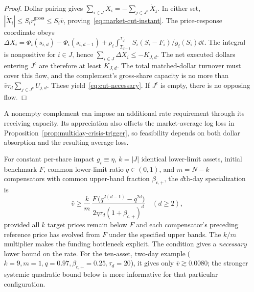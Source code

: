 \documentclass[review,hidelinks,onefignum,onetabnum]{siamonline250211}
\begin{document}
\begin{proof}
Dollar pairing gives $\sum_{i\in J}\dot X_i=-\sum_{j\in J^c}\dot X_j$. In either set, $|\dot X_i|\le S_i r_i^{\mathrm{gross}}\le S_i\bar v$, proving~\eqref{eq:market-cut-instant}. The price-response coordinate obeys
$\Delta X_i=\Phi_i(s_{i,d})-\Phi_i(s_{i,d-1})+
\rho_i\int_{T_{d-1}}^{T_d}S_i(S_i-F_i)/g_i(S_i)\dd t$.
The integral is nonpositive for $i\in J$, hence $\sum_{i\in J}\Delta X_i\le-K_{J,d}$. The net executed dollars entering $J^c$ are therefore at least $K_{J,d}$. The total matched-dollar turnover must cover this flow, and the complement's gross-share capacity is no more than $\bar v\tau_d\sum_{j\in J^c}U_{j,d}$. These yield~\eqref{eq:cut-necessary}. If $J^c$ is empty, there is no opposing flow.
\end{proof}
A nonempty complement can impose an additional rate requirement through its receiving capacity. Its appreciation also offsets the market-average log loss in Proposition~\ref{prop:multiday-crisis-trigger}, so feasibility depends on both dollar absorption and the resulting average loss.

For constant per-share impact $g_i\equiv\eta$, $k=|J|$ identical lower-limit assets, initial benchmark $F$, common lower-limit ratio $q\in(0,1)$, and $m=N-k$ compensators with common upper-band fraction $\beta_{c,+}$, the $d$th-day specialization is
\begin{equation}\label{eq:cut-special}
\boxed{\bar v\ge \frac{k}{m}\,
\frac{F\,\big(q^{2(d-1)}-q^{2d}\big)}{2\eta\tau_d(1+\beta_{c,+})^{d}}\quad(d\ge2),}
\end{equation}
provided all $k$ target prices remain below $F$ and each compensator's preceding reference price has evolved from $F$ under the specified upper bands. The $k/m$ multiplier makes the funding bottleneck explicit. The condition gives a \emph{necessary} lower bound on the rate. For the ten-asset, two-day example ($k=9,m=1,q=0.97,\beta_{c,+}=0.25,\tau_d=20$), it gives only $\bar v\gtrsim 0.0080$; the stronger systemic quadratic bound below is more informative for that particular configuration.
\end{document}
